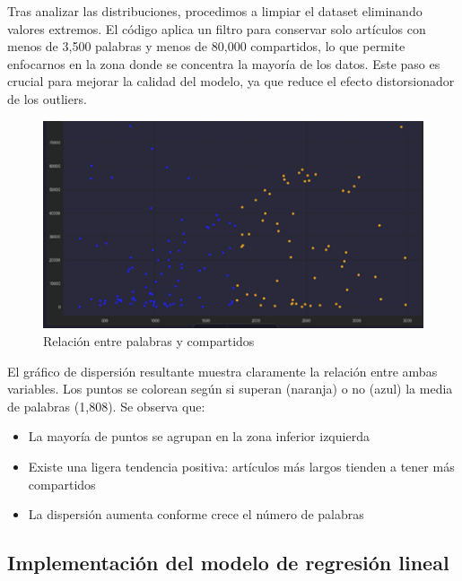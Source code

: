 \documentclass[12pt, a4paper]{article}
\begin{document}
Tras analizar las distribuciones, procedimos a limpiar el dataset eliminando valores extremos. El código aplica un filtro para conservar solo artículos con menos de 3,500 palabras y menos de 80,000 compartidos, lo que permite enfocarnos en la zona donde se concentra la mayoría de los datos. Este paso es crucial para mejorar la calidad del modelo, ya que reduce el efecto distorsionador de los outliers.

\begin{figure}[H]
    \centering
    \includegraphics[width=1.0\textwidth]{Actividad-9/Imagen8.png}
    \caption{Relación entre palabras y compartidos}
\end{figure}

El gráfico de dispersión resultante muestra claramente la relación entre ambas variables. Los puntos se colorean según si superan (naranja) o no (azul) la media de palabras (1,808). Se observa que:

\begin{itemize}
    \item La mayoría de puntos se agrupan en la zona inferior izquierda
    \item Existe una ligera tendencia positiva: artículos más largos tienden a tener más compartidos
    \item La dispersión aumenta conforme crece el número de palabras
\end{itemize}

\subsection{Implementación del modelo de regresión lineal}
\end{document}
